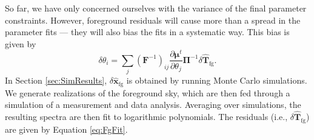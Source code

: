 \documentclass[twolcolumn,apj,iop,numberedappendix]{emulateapj}
\newcommand{\xhat}{\hat{\mathbf{x}}}
\newcommand{\F}{\mathbf{F}}
\begin{document}
So far, we have only concerned ourselves with the variance of the final parameter constraints. However, foreground residuals will cause more than a spread in the parameter fits --- they will also bias the fits in a systematic way. This bias is given by
\begin{equation}
\delta \theta_i = \sum_{j} (\F^{-1})_{ij} \frac{\partial \boldsymbol \mu ^t}{\partial \theta_j} \boldsymbol \Pi ^{-1} \delta \widehat{\mathbf{T}}_\textrm{fg}.
\end{equation}
In Section \ref{sec:SimResults}, $\delta \xhat_\textrm{fg}$ is obtained by running Monte Carlo simulations. We generate realizations of the foreground sky, which are then fed through a simulation of a measurement and data analysis. Averaging over simulations, the resulting spectra are then fit to logarithmic polynomials. The residuals (i.e., $\delta \widehat{\mathbf{T}}_\textrm{fg}$) are given by Equation \eqref{eq:FgFit}.
\end{document}

